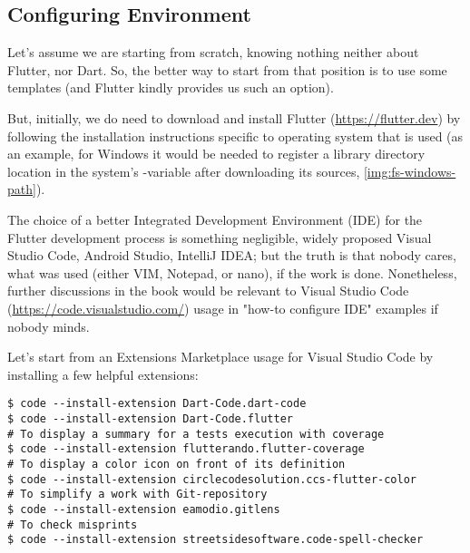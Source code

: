 
\subsection{Configuring Environment} \label{first-step}

Let's assume we are starting from scratch, knowing nothing neither about Flutter, nor Dart. So, the better way to start 
from that position is to use some templates (and Flutter kindly provides us such an option).

But, initially, we do need to download and install Flutter (\href{https://flutter.dev}{https://flutter.dev}) by 
following the installation instructions specific to operating system that is used (as an example, for Windows it 
would be needed to register a library directory location in the system's -variable after downloading its 
sources, \cref{img:fs-windows-path}).


The choice of a better Integrated Development Environment (IDE) for the Flutter development process is something 
negligible, widely proposed Visual Studio Code, Android Studio, IntelliJ IDEA; but the truth is that nobody cares, 
what was used (either VIM, Notepad, or nano), if the work is done. Nonetheless, further discussions in the book would 
be relevant to Visual Studio Code (\href{https://code.visualstudio.com/}{https://code.visualstudio.com/}) usage in 
"how-to configure IDE" examples if nobody minds.

\noindent Let's start from an Extensions Marketplace usage for Visual Studio Code by installing a few helpful extensions:

\begin{lstlisting}[language=terminal]
$ code --install-extension Dart-Code.dart-code
$ code --install-extension Dart-Code.flutter
# To display a summary for a tests execution with coverage
$ code --install-extension flutterando.flutter-coverage
# To display a color icon on front of its definition
$ code --install-extension circlecodesolution.ccs-flutter-color
# To simplify a work with Git-repository
$ code --install-extension eamodio.gitlens
# To check misprints
$ code --install-extension streetsidesoftware.code-spell-checker
\end{lstlisting}

